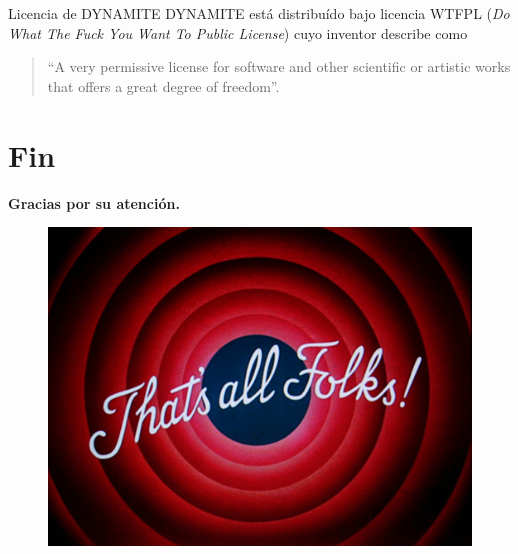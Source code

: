 \documentclass{beamer}
\newcommand{\stframe}[1]{\begin{frame} \begin{center}\Large{\textbf{{#1}}}\end{center}\end{frame}}
\begin{document}
\begin{frame}{Licencia de DYNAMITE}
DYNAMITE está distribuído bajo licencia WTFPL (\textit{Do What The Fuck You Want To Public License}) cuyo inventor describe como
\begin{quote}``A very permissive license for software and other scientific or artistic works that offers a great degree of freedom''.
\end{quote}
\end{frame}

\section{Fin}
\stframe{Gracias por su atención.}

\begin{frame}
\begin{figure} \centering
\includegraphics[scale=0.2]{figures/thats-all-folks.jpg}
\end{figure}
\end{frame}
\end{document}
